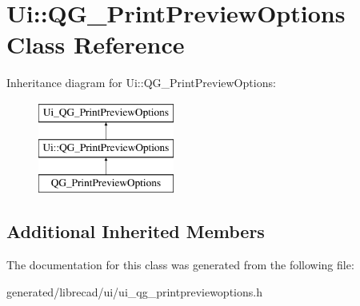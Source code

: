 \hypertarget{classUi_1_1QG__PrintPreviewOptions}{\section{Ui\-:\-:Q\-G\-\_\-\-Print\-Preview\-Options Class Reference}
\label{classUi_1_1QG__PrintPreviewOptions}
}
Inheritance diagram for Ui\-:\-:Q\-G\-\_\-\-Print\-Preview\-Options\-:\begin{figure}[H]
\begin{center}
\leavevmode
\includegraphics[height=3.000000cm]{classUi_1_1QG__PrintPreviewOptions}
\end{center}
\end{figure}
\subsection*{Additional Inherited Members}


The documentation for this class was generated from the following file\-:\begin{DoxyCompactItemize}
\item 
generated/librecad/ui/ui\-\_\-qg\-\_\-printpreviewoptions.\-h\end{DoxyCompactItemize}
